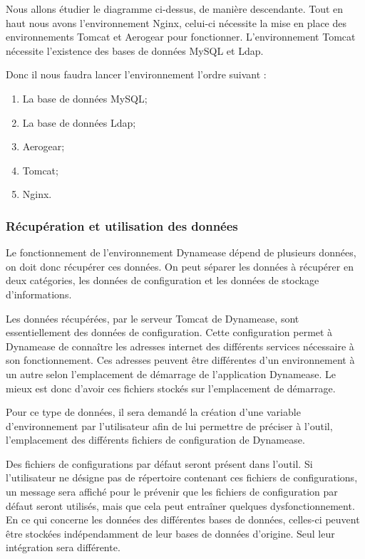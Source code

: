 Nous allons étudier le diagramme ci-dessus, de manière descendante. Tout en haut nous avons l'environnement Nginx, celui-ci nécessite la mise en place des environnements Tomcat et Aerogear pour fonctionner. L'environnement Tomcat nécessite l'existence des bases de données MySQL et Ldap. 

Donc il nous faudra lancer l'environnement l'ordre suivant :

\begin{enumerate}
	\item La base de données MySQL;
	\item La base de données Ldap;
	\item Aerogear;
	\item Tomcat;
	\item Nginx.
\end{enumerate}

\subsubsection{Récupération et utilisation des données}

Le fonctionnement de l'environnement Dynamease dépend de plusieurs données, on doit donc récupérer ces données. On peut séparer les données à récupérer en deux catégories, les données de configuration et les données de stockage d'informations.

Les données récupérées, par le serveur Tomcat de Dynamease, sont essentiellement des données de configuration. Cette configuration permet à Dynamease de connaître les adresses internet des différents services nécessaire à son fonctionnement. Ces adresses peuvent être différentes d'un environnement à un autre selon l'emplacement de démarrage de l'application Dynamease. Le mieux est donc d'avoir ces fichiers stockés sur l'emplacement de démarrage.

Pour ce type de données, il sera demandé la création d'une variable d'environnement par l'utilisateur afin de lui permettre de préciser à l'outil, l'emplacement des différents fichiers de configuration de Dynamease. 

Des fichiers de configurations par défaut seront présent dans l'outil. Si l'utilisateur ne désigne pas de répertoire contenant ces fichiers de configurations, un message sera affiché pour le prévenir que les fichiers de configuration par défaut seront utilisés, mais que cela peut entraîner quelques dysfonctionnement.\\

En ce qui concerne les données des différentes bases de données, celles-ci peuvent être stockées indépendamment de leur bases de données d'origine. Seul leur intégration sera différente.

